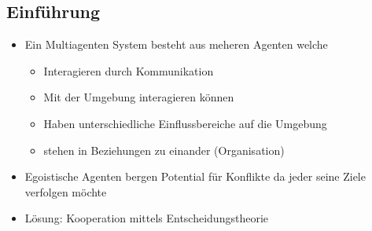 \documentclass{article} %
\begin{document}
	\subsection{Einführung}
	\begin{itemize}
		\item Ein Multiagenten System besteht aus meheren Agenten welche
		\begin{itemize}
			\item Interagieren durch Kommunikation
			\item Mit der Umgebung interagieren können
			\item Haben unterschiedliche Einflussbereiche auf die Umgebung
			\item stehen in Beziehungen zu einander (Organisation)
		\end{itemize}
		\item Egoistische Agenten bergen Potential für Konflikte da jeder seine Ziele verfolgen möchte
		\item Lösung: Kooperation mittels Entscheidungstheorie
	\end{itemize}
\end{document}
